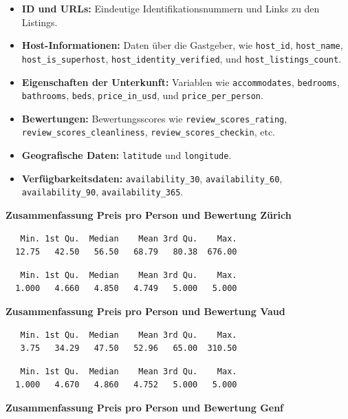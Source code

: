 \documentclass[
  journal,
]{IEEEtran}%
\begin{document}
\begin{itemize}
\item
  \textbf{ID und URLs:} Eindeutige Identifikationsnummern und Links zu
  den Listings.
\item
  \textbf{Host-Informationen:} Daten über die Gastgeber, wie
  \texttt{host\_id}, \texttt{host\_name}, \texttt{host\_is\_superhost},
  \texttt{host\_identity\_verified}, und \texttt{host\_listings\_count}.
\item
  \textbf{Eigenschaften der Unterkunft:} Variablen wie
  \texttt{accommodates}, \texttt{bedrooms}, \texttt{bathrooms},
  \texttt{beds}, \texttt{price\_in\_usd}, und
  \texttt{price\_per\_person}.
\item
  \textbf{Bewertungen:} Bewertungsscores wie
  \texttt{review\_scores\_rating}, \texttt{review\_scores\_cleanliness},
  \texttt{review\_scores\_checkin}, etc.
\item
  \textbf{Geografische Daten:} \texttt{latitude} und \texttt{longitude}.
\item
  \textbf{Verfügbarkeitsdaten:} \texttt{availability\_30},
  \texttt{availability\_60}, \texttt{availability\_90},
  \texttt{availability\_365}.
\end{itemize}

\textbf{Zusammenfassung Preis pro Person und Bewertung Zürich}

\begin{verbatim}
   Min. 1st Qu.  Median    Mean 3rd Qu.    Max. 
  12.75   42.50   56.50   68.79   80.38  676.00 
\end{verbatim}

\begin{verbatim}
   Min. 1st Qu.  Median    Mean 3rd Qu.    Max. 
  1.000   4.660   4.850   4.749   5.000   5.000 
\end{verbatim}

\textbf{Zusammenfassung Preis pro Person und Bewertung Vaud}

\begin{verbatim}
   Min. 1st Qu.  Median    Mean 3rd Qu.    Max. 
   3.75   34.29   47.50   52.96   65.00  310.50 
\end{verbatim}

\begin{verbatim}
   Min. 1st Qu.  Median    Mean 3rd Qu.    Max. 
  1.000   4.670   4.860   4.752   5.000   5.000 
\end{verbatim}

\textbf{Zusammenfassung Preis pro Person und Bewertung Genf}
\end{document}
